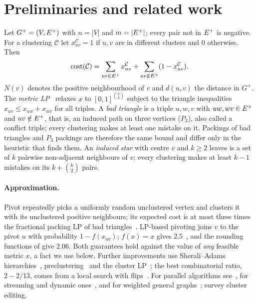 \section{Preliminaries and related work}\label{sec:prelim}

Let $G^+=(V,E^{+})$ with $n=|V|$ and $m=|E^{+}|$; every pair not in $E^{+}$ is
negative.  For a clustering $\mathcal{C}$ let $x^{\mathcal C}_{uv}=1$ if $u,v$
are in different clusters and $0$ otherwise.  Then
\[
\mathrm{cost}(\mathcal C)=\sum_{uv\in E^{+}}x^{\mathcal C}_{uv}+\sum_{uv\notin E^{+}}(1-x^{\mathcal C}_{uv}).
\]
$N(v)$ denotes the positive neighbourhood of $v$ and $d(u,v)$ the distance in
$G^+$.  The \emph{metric LP}~\cite{CharikarGW05,AilonCN08} relaxes $x$ to
$[0,1]^{\binom V2}$ subject to the triangle inequalities
$x_{uv}\le x_{uw}+x_{wv}$ for all triples.  A \emph{bad triangle} is a triple
$u,w,v$ with $uw,wv\in E^{+}$ and $uv\notin E^{+}$, that is, an induced path on
three vertices ($P_3$), also called a conflict triple; every clustering makes
at least one mistake on it.  Packings of bad triangles and $P_3$ packings are
therefore the same bound and differ only in the heuristic that finds them.  An \emph{induced star} with centre $v$ and $k\ge2$ leaves
is a set of $k$ pairwise non-adjacent neighbours of $v$; every clustering makes
at least $k-1$ mistakes on its $k+\binom k2$ pairs.

\paragraph{Approximation.}  Pivot repeatedly picks a uniformly random
unclustered vertex and clusters it with its unclustered positive neighbours;
its expected cost is at most three times the fractional packing LP of bad
triangles~\cite{AilonCN08}.  LP-based pivoting joins $v$ to the pivot $u$ with
probability $1-f(x_{uv})$; $f(x)=x$ gives $2.5$~\cite{AilonCN08}, and the
rounding functions of \citet{ChawlaMSY15} give $2.06$.  Both guarantees hold
against the value of \emph{any} feasible metric $x$, a fact we use below.
Further improvements use Sherali--Adams
hierarchies~\cite{CohenAddadLN22}, preclustering~\cite{CohenAddadLLN23} and
the cluster LP~\cite{CaoCLLNV24,CaoCLLLNTVYZ25,GarciaSorianoS26}; the best
combinatorial ratio, $2-2/13$, comes from a local search with
flips~\cite{CohenAddadLPTYZ24}.  For parallel algorithms
see~\cite{cohenaddad2021constant,behnezhad2022almost3}, for streaming and
dynamic ones~\cite{behnezhad2023singlepass,cambus2024dynamicstreams,
cohenaddad2024dynamic}, and for weighted general graphs~\cite{DemaineEFI06};
\citet{BockerB13} survey cluster editing.

